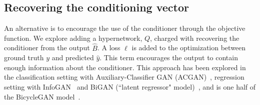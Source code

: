 \subsection{Recovering the conditioning vector}

An alternative is to encourage the use of the conditioner through the objective function. We explore adding a hypernetwork, $Q$, charged with recovering the conditioner from the output $\widehat{B}$. A loss $\ell$ is added to the optimization between ground truth $y$ and predicted $\hat{y}$. This term encourages the output to contain enough information about the conditioner. This approach has been explored in the classification setting with Auxiliary-Classifier GAN (ACGAN)~\cite{XX}, regression setting with InfoGAN~\cite{XX} and BiGAN (``latent regressor" model)~\cite{XX}, and is one half of the BicycleGAN model~\cite{zhu2017toward}.

